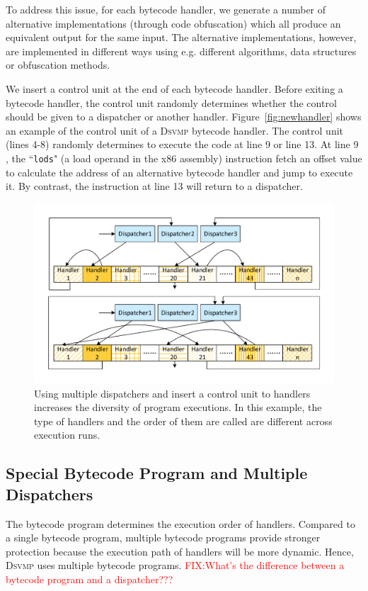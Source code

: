 \documentclass[preprint,12pt,3p]{elsarticle}
\newcommand{\DSVMP}{\textsc{Dsvmp}\xspace}
\newcommand\FIXME[1]{\textcolor{red}{FIX:}\textcolor{red}{#1}}
\begin{document}
To address this issue, for each bytecode handler, we generate a number of alternative implementations (through code obfuscation) which all
produce an equivalent output for the same input. The alternative implementations, however,
are implemented in different ways using e.g. different algorithms, data structures or obfuscation methods.

We insert a control unit at the end of each bytecode handler. Before exiting a bytecode handler,
the control unit randomly determines whether the control should be given to a dispatcher or
another handler. Figure~\ref{fig:newhandler} shows an example of the control unit of a \DSVMP bytecode handler.
The control unit (lines 4-8) randomly determines to execute the code at line 9 or line 13.
At line 9 , the ``\texttt{lods}" (a load operand in the x86 assembly) instruction fetch an offset value
to calculate the address of an alternative bytecode handler and jump to execute it.
By contrast, the instruction at line 13 will return to a dispatcher.

\begin{figure}[!t]
  \centering
  \includegraphics[width=0.65\columnwidth]{figure/figdh.pdf}
  \caption{Using multiple dispatchers and insert a control unit to handlers increases the diversity of program executions. In this example, the type of handlers and the order of them are called are different across execution runs. }\label{fig:Fig.dh}
\end{figure}

\subsection{Special Bytecode Program and Multiple Dispatchers}\label{sec:mbd}
The bytecode program  determines the execution order of handlers. Compared to a single bytecode program,
multiple bytecode programs provide stronger protection because the execution path of handlers will be more dynamic.
Hence, \DSVMP uses multiple bytecode programs. \FIXME{What's the difference between a bytecode program 
and a dispatcher???}
\end{document}

